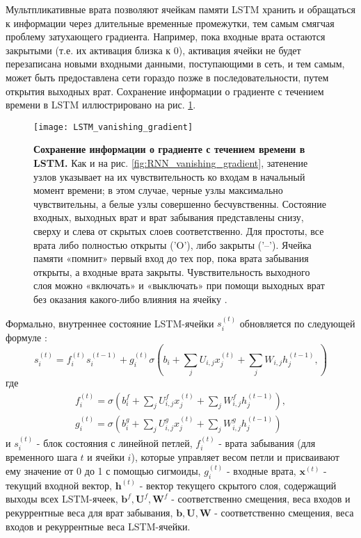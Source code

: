 Мультпликативные врата позволяют ячейкам памяти LSTM хранить и обращаться 
к информации через длительные временные промежутки, тем самым 
смягчая проблему затухающего градиента. Например, пока входные врата 
остаются закрытыми (т.е. их активация близка к 0), 
активация ячейки не будет перезаписана новыми входными данными, поступающими 
в сеть, и тем самым, может быть предоставлена сети гораздо позже в 
последовательности, путем открытия выходных врат. Сохранение информации о 
градиенте с течением времени в LSTM иллюстрировано на рис. \ref{fig:LSTM_vanishing_gradient}.

\begin{figure}[h!]
    \centering
    \texttt{[image: LSTM\_vanishing\_gradient]}
    \caption{\textbf{Сохранение информации о 
    градиенте с течением времени в LSTM.} Как и на рис. 
    \ref{fig:RNN_vanishing_gradient}, затенение узлов указывает на 
    их чувствительность ко входам в начальный момент времени; в 
    этом случае, черные узлы максимально чувствительны, а 
    белые узлы совершенно бесчувственны. Состояние 
    входных, выходных врат и врат забывания представлены 
    снизу, сверху и слева от скрытых слоев соответственно. Для 
    простоты, все врата либо полностью открыты ('O'), либо закрыты ('--'). 
    Ячейка памяти «помнит» первый вход до тех пор, пока врата забывания 
    открыты, а входные врата закрыты. Чувствительность выходного слоя 
    можно «включать» и «выключать» при помощи выходных врат без оказания 
    какого-либо влияния на ячейку \cite{graves}.}
    \label{fig:LSTM_vanishing_gradient}
\end{figure}

Формально, внутреннее состояние LSTM-ячейки $s_i^{(t)}$ обновляется по следующей 
формуле \cite{Goodfellow-et-al-2016}:
\begin{equation*}
    s_i^{(t)} = f_i^{(t)} s_i^{(t-1)} + g_i^{(t)} \sigma \left( 
        b_i + \sum_j U_{i,j} x_j^{(t)} + \sum_j W_{i,j} h_j^{(t-1)},
    \right)
\end{equation*}
где\vspace{-5pt}
\begin{gather*}
    f_i^{(t)} = \sigma \left( 
        b_i^f + \sum_j U_{i,j}^f x_j^{(t)} + \sum_j W_{i,j}^f h_j^{(t-1)}
    \right), \\[0.5em]
    g_i^{(t)} = \sigma \left( 
        b_i^g + \sum_j U_{i,j}^g x_j^{(t)} + \sum_j W_{i,j}^g h_j^{(t-1)}
    \right)
\end{gather*}
и
$s_i^{(t)}$ - блок состояния с линейной петлей, 
$f_i^{(t)}$ - врата забывания (для временного шага $t$ и ячейки $i$), 
которые управляет весом петли и присваивают ему значение от 0 до 1 с помощью 
сигмоиды,
$g_i^{(t)}$ - входные врата,
$\bm{x}^{(t)}$ - текущий входной вектор,
$\bm{h}^{(t)}$ - вектор текущего скрытого слоя, содержащий выходы всех LSTM-ячеек,
$\bm{b}^f, \bm{U}^f, \bm{W}^f$ - соответственно смещения, веса входов и рекуррентные веса для врат забывания,
$\bm{b}, \bm{U}, \bm{W}$ - соответственно смещения, веса входов и рекуррентные веса LSTM-ячейки. 

